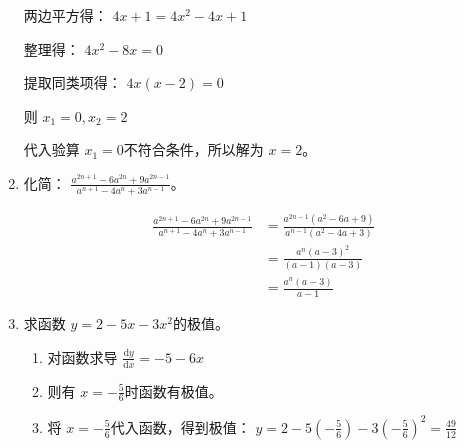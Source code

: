 \documentclass[answers]{exam}
\begin{document}
\begin{questions}
\begin{enumerate}[label=(\arabic*)]
\begin{solution}
			      两边平方得：
			      \begin{math}
				      4x + 1 = 4x^2 - 4x + 1
			      \end{math}

			      整理得：
			      \begin{math}
				      4x^2 -8x = 0
			      \end{math}

			      提取同类项得：
			      \begin{math}
				      4x(x-2) = 0
			      \end{math}

			      则
			      \begin{math}
				      x_1 = 0, x_2 = 2
			      \end{math}

			      代入验算 \( x_1 = 0  \)不符合条件，所以解为 \( x=2 \)。
		      \end{solution}
		\item 化简： \( \displaystyle \frac{a^{2n+1} - 6a^{2n} + 9a^{2n-1}}{a^{n+1} - 4a^n + 3a^{n-1}} \)。
		      \begin{solution}
			      \begin{align*}
				      \frac{a^{2n+1} - 6a^{2n} + 9a^{2n-1}}{a^{n+1} - 4a^n + 3a^{n-1}} & = \frac{a^{2n-1}(a^2 - 6a + 9)}{a^{n-1}(a^2-4a+3)}
				      \\
				                                                                       & = \frac{a^n(a-3)^2}{(a-1)(a-3)}
				      \\
				                                                                       & = \frac{a^n(a-3)}{a-1}
			      \end{align*}
		      \end{solution}
		\item 求函数 \( y = 2 - 5x - 3x^2 \)的极值。
		      \begin{solution}
			      \begin{enumerate}[label=\alph*.]
				      \item 对函数求导
				            \begin{math}
					            \frac{\text{d}y}{\text{d}x} = -5 - 6x
				            \end{math}
				      \item 则有 \( x = -\frac56 \)时函数有极值。
				      \item 将 \( x = -\frac56 \)代入函数，得到极值：
				            \begin{math}
					            y = 2 - 5(-\frac56) - 3(-\frac56)^2 = \frac{49}{12}
				            \end{math}

			      \end{enumerate}
		      \end{solution}
	\end{enumerate}
\end{questions}
\end{document}
